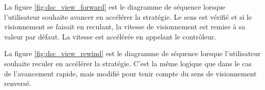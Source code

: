 La figure \ref{fig:dsc_view_forward} est le diagramme de séquence lorsque l'utilisateur souhaite avancer en accélérer la stratégie.
Le sens est vérifié et si le visionnement se faisait en reculant, la vitesse de visionnement est remise à sa valeur par défaut.
La vitesse est accélérée en appelant le contrôleur.


La figure \ref{fig:dsc_view_rewind} est le diagramme de séquence lorsque l'utilisateur souhaite reculer en accélérer la stratégie.
C'est la même logique que dans le cas de l'avancement rapide, mais modifié pour tenir compte du sens de visionnement renversé.

